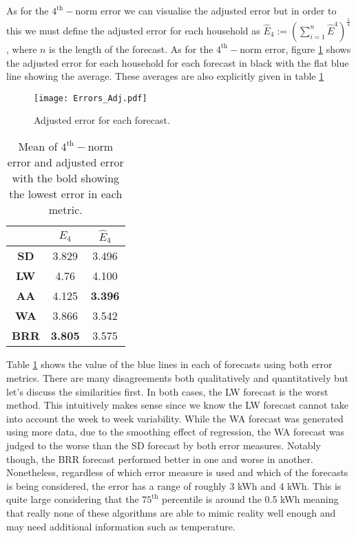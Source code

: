 As for the $4^{\text{th}}-$norm error we can visualise the adjusted error but in order to this we must define the adjusted error for each household as $\hat{E}_4 := \left( \sum_{i=1}^{n} \hat{E}^4\right)^{\frac{1}{4}}$, where $n$ is the length of the forecast. As for the $4^{\text{th}}-$norm error, figure \ref{fig:Adj_err_all} shows the adjusted error for each household for each forecast in black with the flat blue line showing the average. These averages are also explicitly given in table \ref{tab:errs}

\begin{figure}
\centering
\texttt{[image: Errors\_Adj.pdf]}
\caption{\label{fig:Adj_err_all} Adjusted error for each forecast.}
\end{figure}


\begin{table}
\centering
\begin{tabular}{|c|c|c|}
\hline
 & $E_4$ & $\hat{E}_4$ \\
 \hline
\textbf{SD} & 3.829 & 3.496 \\
\textbf{LW} & 4.76 & 4.100 \\ 
\textbf{AA} & 4.125 & \textbf{3.396} \\ 
\textbf{WA} & 3.866 & 3.542 \\ 
\textbf{BRR} & \textbf{3.805} & 3.575 \\
\hline
\end{tabular}
\caption{Mean of $4^{\text{th}}-$norm error and adjusted error with the bold showing the lowest error in each metric.}
\label{tab:errs}
\end{table}


Table \ref{tab:errs} shows the value of the blue lines in each of forecasts using both error metrics. There are many disagreements both qualitatively and quantitatively but let's discuss the similarities first. In both cases, the LW forecast is the worst method. This intuitively makes sense since we know the LW forecast cannot take into account the week to week variability. While the WA forecast was generated using more data, due to the smoothing effect of regression, the WA forecast was judged to the worse than the SD forecast by both error measures. Notably though, the BRR forecast performed better in one and worse in another. Nonetheless, regardless of which error measure is used and which of the forecasts is being considered, the error has a range of roughly 3 kWh and 4 kWh. This is quite large considering that the $75^{\text{th}}$ percentile is around the 0.5 kWh meaning that really none of these algorithms are able to mimic reality well enough and may need additional information such as temperature.


